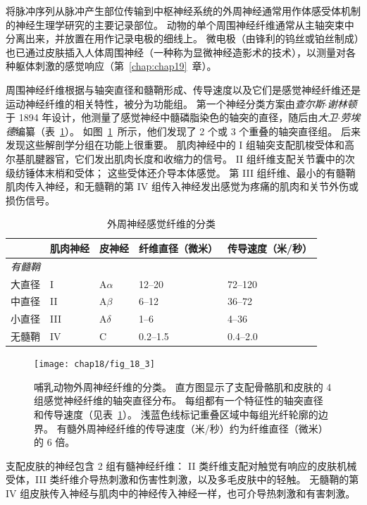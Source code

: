将脉冲序列从脉冲产生部位传输到中枢神经系统的外周神经通常用作体感受体机制的神经生理学研究的主要记录部位。
动物的单个周围神经纤维通常从主轴突束中分离出来，并放置在用作记录电极的细线上。
微电极（由锋利的钨丝或铂丝制成）也已通过皮肤插入人体周围神经（一种称为显微神经造影术的技术），以测量对各种躯体刺激的感觉响应（第~\ref{chap:chap19}~章）。


周围神经纤维根据与轴突直径和髓鞘形成、传导速度以及它们是感觉神经纤维还是运动神经纤维的相关特性，被分为功能组。
第一个神经分类方案由\textit{查尔斯$\cdot$谢林顿}于 1894 年设计，他测量了感觉神经中髓磷脂染色的轴突的直径，随后由\textit{大卫$\cdot$劳埃德}编纂（表~\ref{tab:18_1}）。
如图~\ref{fig:18_3}~所示，他们发现了 2 个或 3 个重叠的轴突直径组。
后来发现这些解剖学分组在功能上很重要。
肌肉神经中的 I 组轴突支配肌梭受体和高尔基肌腱器官，它们发出肌肉长度和收缩力的信号。
II 组纤维支配关节囊中的次级纺锤体末梢和受体；
这些受体还介导本体感觉。
第 III 组纤维、最小的有髓鞘肌肉传入神经，和无髓鞘的第 IV 组传入神经发出感觉为疼痛的肌肉和关节外伤或损伤信号。


\begin{table}[htbp]
	\caption{外周神经感觉纤维的分类} \label{tab:18_1} \centering
	\begin{tabular}{lllll}
		\toprule
		 & 肌肉神经 & 皮神经 & 纤维直径（微米） & 传导速度（米/秒）\\
		\midrule
		\textit{有髓鞘} &  &  & &  \\
		大直径 & I  & A$\alpha$ & 12–20 & 72–120 \\
		中直径 & II  & A$\beta$ & 6–12 & 36–72 \\
		小直径 & III  & A$\delta$ & 1–6 & 4–36 \\
		无髓鞘 & IV  & C & 0.2–1.5 & 0.4–2.0 \\
		\bottomrule
	\end{tabular}
\end{table}



\begin{figure}[htbp]
	\centering
	\texttt{[image: chap18/fig\_18\_3]}
	\caption{哺乳动物外周神经纤维的分类。
	直方图显示了支配骨骼肌和皮肤的 4 组感觉神经纤维的轴突直径分布。
	每组都有一个特征性的轴突直径和传导速度（见表~\ref{tab:18_1}）。
	浅蓝色线标记重叠区域中每组光纤轮廓的边界。
	有髓外周神经纤维的传导速度（米/秒）约为纤维直径（微米）的 6 倍。}
	\label{fig:18_3}
\end{figure}



支配皮肤的神经包含 2 组有髓神经纤维：
II 类纤维支配对触觉有响应的皮肤机械受体，III 类纤维介导热刺激和伤害性刺激，以及多毛皮肤中的轻触。
无髓鞘的第 IV 组皮肤传入神经与肌肉中的神经传入神经一样，也可介导热刺激和有害刺激。


